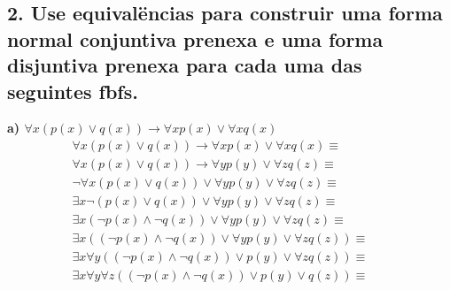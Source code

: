 \subsection*{2. Use equivalëncias para construir uma forma normal conjuntiva prenexa e uma forma disjuntiva prenexa para cada uma das seguintes fbfs.}

\textbf{a) $\forall x (p(x) \lor q(x)) \rightarrow \forall x p(x) \lor \forall x q(x) $} \\
\begin{align*}
\forall x (p(x) \lor q(x)) \rightarrow \forall x p(x) \lor \forall x q(x) \equiv \\
\forall x (p(x) \lor q(x)) \rightarrow \forall y p(y) \lor \forall z q(z) \equiv && \tag*{Renom.} \\
\lnot \forall x (p(x) \lor q(x)) \lor \forall y p(y) \lor \forall z q(z) \equiv && \tag*{Rem. $\rightarrow$} \\
\exists x \lnot (p(x) \lor q(x)) \lor \forall y p(y) \lor \forall z q(z) \equiv && \tag*{$\lnot \forall$} \\
\exists x (\lnot p(x) \land \lnot q(x)) \lor \forall y p(y) \lor \forall z q(z) \equiv && \tag*{$\lnot (A \lor B) \equiv \lnot A \land \lnot B $} \\
\exists x ((\lnot p(x) \land \lnot q(x)) \lor \forall y p(y) \lor \forall z q(z)) \equiv && \tag*{Adicionando ()} \\
\exists x \forall y ((\lnot p(x) \land \lnot q(x)) \lor p(y) \lor \forall z q(z)) \equiv && \tag*{iv (b)} \\
\exists x \forall y \forall z ((\lnot p(x) \land \lnot q(x)) \lor p(y) \lor q(z)) \equiv && \tag*{iv (b)} \\
\end{align*}